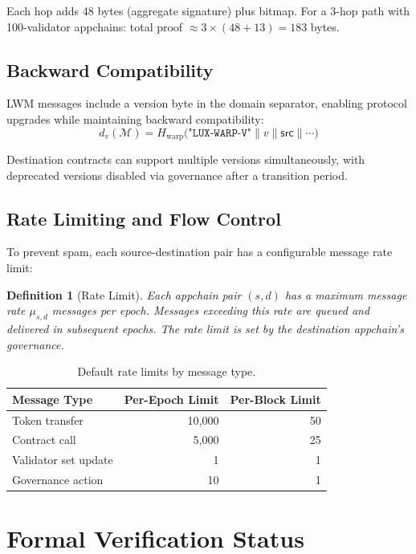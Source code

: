\documentclass[11pt,a4paper]{article}
\newtheorem{definition}{Definition}
\begin{document}
Each hop adds 48 bytes (aggregate signature) plus bitmap. For a 3-hop path with 100-validator appchains: total proof $\approx 3 \times (48 + 13) = 183$ bytes.

\subsection{Backward Compatibility}

LWM messages include a version byte in the domain separator, enabling protocol upgrades while maintaining backward compatibility:
\begin{equation}
    d_v(\mathcal{M}) = H_{\text{warp}}\bigl(\texttt{"LUX-WARP-V"} \| v \| \mathsf{src} \| \cdots\bigr)
\end{equation}

Destination contracts can support multiple versions simultaneously, with deprecated versions disabled via governance after a transition period.

\subsection{Rate Limiting and Flow Control}

To prevent spam, each source-destination pair has a configurable message rate limit:

\begin{definition}[Rate Limit]
Each appchain pair $(s, d)$ has a maximum message rate $\mu_{s,d}$ messages per epoch. Messages exceeding this rate are queued and delivered in subsequent epochs. The rate limit is set by the destination appchain's governance.
\end{definition}

\begin{table}[H]
\centering
\caption{Default rate limits by message type.}
\label{tab:ratelimits}
\begin{tabular}{lrr}
\toprule
\textbf{Message Type} & \textbf{Per-Epoch Limit} & \textbf{Per-Block Limit} \\
\midrule
Token transfer & 10,000 & 50 \\
Contract call & 5,000 & 25 \\
Validator set update & 1 & 1 \\
Governance action & 10 & 1 \\
\bottomrule
\end{tabular}
\end{table}

\section{Formal Verification Status}\label{sec:formal}
\end{document}
